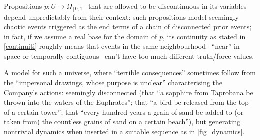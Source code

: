 \begin{example}\label{bli}
	Propositions $p : U \to \Omega_{[0,1]}$ that are allowed to be discontinuous in its variables depend unpredictably from their context: such propositions model seemingly chaotic events triggered as the end terms of a chain of disconnected prior events; in fact, if we assume a real base for the domain of $p$, its continuity as stated in \autoref{continuiti} roughly means that events in the same neighbourhood --``near'' in space or temporally contiguous-- can't have too much different truth/force values.

	A model for such a universe, where ``terrible consequences'' sometimes follow from the ``impersonal drawings, whose purpose is unclear'' characterising the Company's actions: seemingly disconnected (that ``a sapphire from Taprobana be thrown into the waters of the Euphrates''; that ``a bird be released from the top of a certain tower''; that ``every hundred years a grain of sand be added to (or taken from) the countless grains of sand on a certain beach''), but generating nontrivial dynamics when inserted in a suitable sequence as in \autoref{fig_dynamics}.


\end{example}

